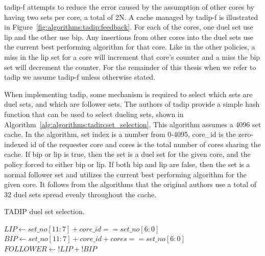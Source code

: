\gls{tadip-f} attempts to reduce the error caused by the assumption of other cores by having two sets per core, a total of 2N.
A cache managed by \gls{tadip-f} is illustrated in Figure~\ref{fig:algorithms:tadip:feedback}.
For each of the cores, one duel set use \gls{lip} and the other use \gls{bip}. 
Any insertions from other cores into the duel sets use the current best performing algorithm for that core.
Like in the other policies, a miss in the \gls{lip} set for a core will increment that core's counter and a miss the \gls{bip} set will decrement the counter.
For the remainder of this thesis when we refer to \gls{tadip} we assume \gls{tadip-f} unless otherwise stated.

When implementing \gls{tadip}, some mechanism is required to select which sets are duel sets, and which are follower sets.
The authors of \gls{tadip} provide a simple hash function that can be used to select dueling sets, shown in Algorithm~\ref{alg:algorithms:tadip:set_selection}.
This algorithm assumes a 4096 set cache.
In the algorithm, set index is a number from 0-4095, core\_id is the zero-indexed id of the requester core and cores is the total number of cores sharing the cache.
If \gls{bip} or \gls{lip} is true, then the set is a duel set for the given core, and the policy forced to either \gls{bip} or \gls{lip}.
If both \gls{bip} and \gls{lip} are false, then the set is a normal follower set and utilizes the current best performing algorithm for the given core.
It follows from the algorithms that the original authors use a total of 32 duel sets spread evenly throughout the cache.

\begin{algorithm}[ht]
\caption{TADIP duel set selection.}
\label{alg:algorithms:tadip:set_selection}
\begin{algorithmic}[1]
\State $LIP\gets set\_no[11:7] + core\_id == set\_no[6:0]$
\State $BIP\gets set\_no[11:7] + core\_id + cores == set\_no[6:0]$
\State $FOLLOWER\gets !LIP + !BIP$
\end{algorithmic}
\end{algorithm}
